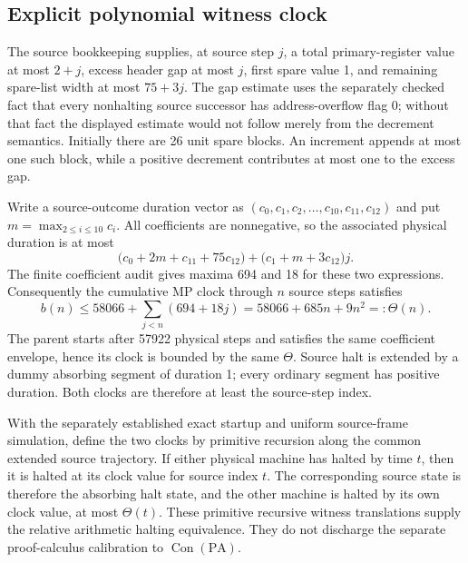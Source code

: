 \subsection{Explicit polynomial witness clock}
The source bookkeeping supplies, at source step $j$, a total primary-register
value at most $2+j$, excess header gap at most $j$, first spare value 1, and
remaining spare-list width at most $75+3 j$. The gap estimate uses the separately
checked fact that every nonhalting source successor has address-overflow flag 0;
without that fact the displayed estimate would not follow merely from the
decrement semantics. Initially there are 26 unit spare blocks. An increment
appends at most one such block, while a positive decrement contributes at most
one to the excess gap.

Write a source-outcome duration vector as
$(c_0,c_1,c_2,\ldots,c_{10},c_{11},c_{12})$ and put
$m=\max_{2\leq i\leq 10}c_i$. All coefficients are nonnegative, so the associated
physical duration is at most
\[
 \bigl(c_0+2 m+c_{11}+75 c_{12}\bigr)
 +\bigl(c_1+m+3 c_{12}\bigr)j.
\]
The finite coefficient audit gives maxima 694 and 18 for these two expressions.
Consequently the cumulative MP clock through $n$ source steps satisfies
\[
 b(n)\leq 58066+\sum_{j<n}(694+18 j)
       =58066+685 n+9 n^2=: \Theta(n).
\]
The parent starts after 57922 physical steps and satisfies the same coefficient
envelope, hence its clock is bounded by the same $\Theta$. Source halt is
extended by a dummy absorbing segment of duration 1; every ordinary segment has
positive duration. Both clocks are therefore at least the source-step index.

With the separately established exact startup and uniform source-frame
simulation, define the two clocks by primitive recursion along the common
extended source trajectory. If either physical machine has halted by time $t$,
then it is halted at its clock value for source index $t$. The corresponding
source state is therefore the absorbing halt state, and the other machine is
halted by its own clock value, at most $\Theta(t)$. These primitive recursive
witness translations supply the relative arithmetic halting equivalence.
They do not discharge the separate proof-calculus calibration to
$\operatorname{Con}(\mathrm{PA})$.
